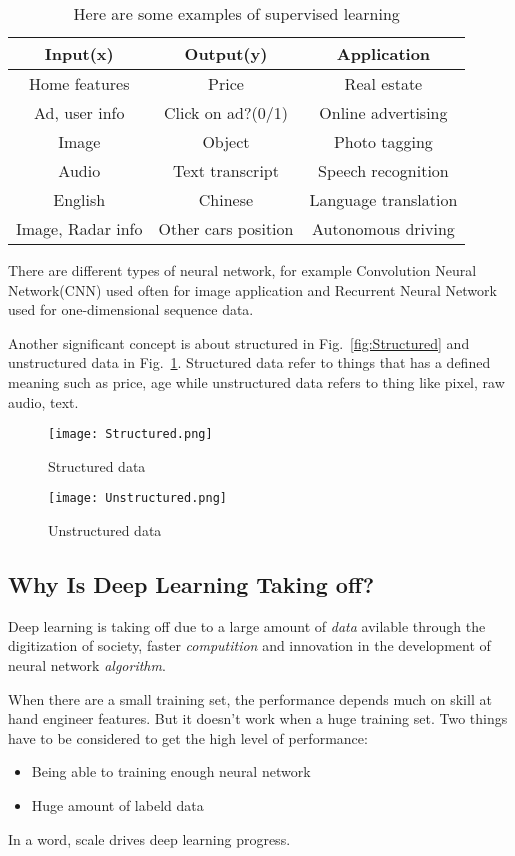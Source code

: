 \documentclass[a4paper]{article}
\begin{document}
\begin{table}[hb]
    \centering
    \caption{Here are some examples of supervised learning}
    \begin{tabular}{|c|c|c|}
    \hline
        Input(x) & Output(y) & Application \\
        \hline 
        Home features & Price & Real estate \\ \hline
		Ad, user info & Click on ad?(0/1) & Online advertising \\ 		\hline
		Image & Object & Photo tagging \\ \hline
		Audio & Text transcript & Speech recognition \\ \hline
		English & Chinese & Language translation \\ \hline
		Image, Radar info & Other cars position & Autonomous driving \\ \hline
    \end{tabular}
    \label{tab:Examples}
\end{table}

There are different types of neural network, for example Convolution Neural Network(CNN) used often for image application and Recurrent Neural Network used for one-dimensional sequence data.\par
Another significant concept is about structured in Fig.~\ref{fig:Structured} and unstructured data in Fig.~\ref{fig:Unstructured}. Structured data refer to things that has a defined meaning such as price, age while unstructured data refers to thing like pixel, raw audio, text.\par

\begin{figure}
\begin{minipage}[t]{0.5\linewidth}
\centering
\texttt{[image: Structured.png]}
\caption{Structured data~\cite{Coursera.org}}
\label{fig:Structured}
\end{minipage}%
\begin{minipage}[t]{0.5\linewidth}
\centering
\texttt{[image: Unstructured.png]}
\caption{Unstructured data~\cite{Coursera.org}}
\label{fig:Unstructured}
\end{minipage}
\end{figure}


\subsection{Why Is Deep Learning Taking off?}
Deep learning is taking off due to a large amount of \emph{data} avilable through the digitization of society, faster \emph{computition} and innovation in the development of neural network \emph{algorithm}.\par
When there are a small training set, the performance depends much on skill at hand engineer features. But it doesn't work when a huge training set. Two things have to be considered to get the high level of performance:
\begin{itemize}
\item Being able to training enough neural network
\item Huge amount of labeld data 
\end{itemize}
In a word, scale drives deep learning progress.
\end{document}
